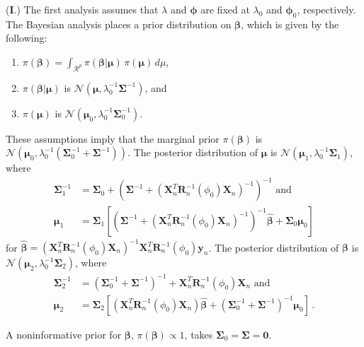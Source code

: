 \documentclass[11pt, oneside]{article}   	%
\begin{document}
({\bf I}.)  The first analysis assumes that $\lambda$ and $\mathbf{\phi}$ are fixed at $\lambda_0$ and $\mathbf{\phi}_0$, respectively.  The Bayesian analysis places a prior distribution on $\mathbf{\beta}$, which is given by the following:
\begin{enumerate}
\item $\pi(\mathbf{\beta}) = \int_{\mathcal{R}^p} \pi(\mathbf{\beta} | \mathbf{\mu}) \, \pi(\mathbf{\mu}) \, d\mu$,
\item $\pi(\mathbf{\beta} | \mathbf{\mu})$ is $\mathcal{N}( \mathbf{\mu}, \lambda_0^{-1} \mathbf{\Sigma}^{-1} )$, and
\item $\pi(\mathbf{\mu})$ is $\mathcal{N}( \mathbf{\mu}_0, \lambda_0^{-1} \mathbf{\Sigma}_0^{-1} )$.
\end{enumerate}
These assumptions imply that the marginal prior $\pi(\mathbf{\beta})$ is $\mathcal{N} \left( \mathbf{\mu}_0, \lambda_0^{-1} \left( \mathbf{\Sigma}_0^{-1}+\mathbf{\Sigma}^{-1} \right) \right)$.  The posterior distribution of $\mathbf{\mu}$ is $\mathcal{N} \left( \mathbf{\mu}_1, \lambda_0^{-1} \mathbf{\Sigma}_1 \right)$, where
\begin{align*}
\mathbf{\Sigma}_1^{-1} &= \mathbf{\Sigma}_0 + \left( \mathbf{\Sigma}^{-1} + \left( \mathbf{X}_n^T \mathbf{R}_n^{-1} (\phi_0) \mathbf{X}_n \right)^{-1} \right)^{-1} \mbox{ and} \\[1ex]
\mathbf{\mu}_1 & = \mathbf{\Sigma}_1 \left[ \left( \mathbf{\Sigma}^{-1} +\left(\mathbf{X}_n^T \mathbf{R}_n^{-1} (\phi_0) \mathbf{X}_n \right)^{-1} \right)^{-1} \hat{\mathbf{\beta}} + \mathbf{\Sigma}_0 \mathbf{\mu}_0 \right]
\end{align*}
for $\hat{\mathbf{\beta}} = \left( \mathbf{X}_n^T \mathbf{R}_n^{-1} (\phi_0) \mathbf{X}_n \right)^{-1} \mathbf{X}_n^T \mathbf{R}_n^{-1} (\phi_0) \mathbf{y}_n$.  The posterior distribution of $\mathbf{\beta}$ is $\mathcal{N} \left( \mathbf{\mu}_2, \lambda_0^{-1} \mathbf{\Sigma}_2 \right)$, where
\begin{align*}
\mathbf{\Sigma}_2^{-1} &= \left(\mathbf{\Sigma}_0^{-1} + \mathbf{\Sigma}^{-1}\right)^{-1} + \mathbf{X}_n^T \mathbf{R}_n^{-1} (\phi_0) \mathbf{X}_n \mbox{ and} \\[1ex]
\mathbf{\mu}_2 & = \mathbf{\Sigma}_2 \left[ (\mathbf{X}_n^T \mathbf{R}_n^{-1} (\phi_0) \mathbf{X}_n) \hat{\mathbf{\beta}} + \left(\mathbf{\Sigma}_0^{-1} + \mathbf{\Sigma}^{-1} \right)^{-1} \mathbf{\mu}_0 \right] \,.
\end{align*}

A noninformative prior for $\mathbf{\beta}$, $\pi(\mathbf{\beta}) \propto 1$, takes $\mathbf{\Sigma}_0 = \mathbf{\Sigma} = \mathbf{0}$.
\end{document}
